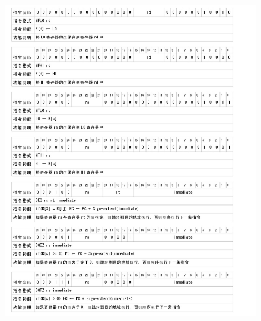     \begin{figure}[!hbp]
            \centering
            \includegraphics[width=\textwidth]{chart/insert2.jpg}
    \end{figure}
    

